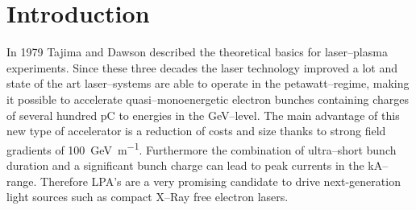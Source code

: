 \documentclass[%
reprint,
amsmath,
amssymb,
aip,
rsi, 
numerical,
floatfix,
]{revtex4-1}
\newcommand{\myCite}[1]{\textcolor{blue}{\cite{#1}}}
\begin{document}
\maketitle



\section{\label{Mot} Introduction}

In 1979 Tajima and Dawson described the theoretical basics for laser--plasma experiments\myCite{Tajima1979}.
Since these three decades the laser technology improved a lot and state of the art laser--systems are able to operate in the petawatt--regime\myCite{Gaul2010}, making it possible to accelerate quasi--monoenergetic\myCite{Geddes2004, Faure2004, Mangles2004} electron bunches containing charges of several hundred \si{\pico\coulomb} to energies in the \si{\giga\electronvolt}--level\myCite{Leemans2014,Schroeder2007,Wang2013}.
The main advantage of this new type of accelerator is a reduction of costs and size thanks to strong field gradients of \SI[per-mode=symbol]{100}{\giga\electronvolt\per\metre}\myCite{Esarey2009,Hooker2013}. 
Furthermore the combination of ultra--short bunch duration and a significant bunch charge can lead to peak currents in the \si{\kilo\ampere}--range. Therefore LPA's are a very promising candidate to drive next-generation light sources such as compact X--Ray free electron lasers\myCite{Albert2014}.
 
\end{document}
